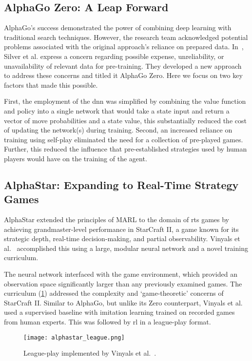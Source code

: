     \subsection*{AlphaGo Zero: A Leap Forward}

AlphaGo's success demonstrated the power of combining deep learning with 
traditional search techniques. However, the research team acknowledged potential
problems associated with the original approach's reliance on prepared data. 
In~\cite{silver2017}, Silver et al. express a concern regarding possible 
expense, unreliability, or unavailability of relevant data for pre-training.
They developed a new approach to address these concerns and titled it 
AlphaGo Zero. Here we focus on two key factors that made this possible.

First, the employment of the \gls{dnn} was simplified by combining the 
value function and policy into a single network that would take a state 
input and return a vector of move probabilities and a state value, 
this substantially reduced the cost of updating the network(s) during training.
%
Second, an increased reliance on training using self-play
eliminated the need for a collection of pre-played games.
Further, this reduced the influence that pre-established strategies 
used by human players would have on the training of the agent.

    \subsection*{AlphaStar: Expanding to Real-Time Strategy Games}

AlphaStar extended the principles of MARL to the domain of \gls{rts} 
games by achieving grandmaster-level performance in StarCraft II, 
a game known for its strategic depth, real-time decision-making, 
and partial observability. Vinyals et al.~\cite{vinyals2019} accomplished 
this using a large, modular neural network and a novel training curriculum.

The neural network interfaced with the game environment, which provided an 
observation space significantly larger than any previously examined games. 
The curriculum (\cref{fig:alphastar_league}) addressed the complexity 
and `game-theoretic' concerns of StarCraft II. Similar to AlphaGo, 
but unlike its Zero counterpart, Vinyals et al. used a supervised baseline 
with imitation learning trained on recorded games from human experts. 
This was followed by \gls{rl} in a league-play format.

\begin{figure}[t]
    \centering
    \texttt{[image: alphastar\_league.png]}
    \caption{League-play implemented by Vinyals et al.~\cite{vinyals2019}.}
    \label{fig:alphastar_league}
\end{figure}

